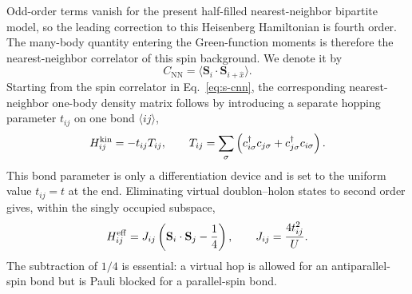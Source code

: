 \documentclass[10pt]{article}
\newcommand{\Cnn}{C_{\mathrm{NN}}}
\begin{document}
Odd-order terms vanish for the present half-filled nearest-neighbor bipartite
model, so the leading correction to this Heisenberg Hamiltonian is fourth
order.  The many-body quantity entering the Green-function moments is
therefore the nearest-neighbor correlator of this spin background.  We denote
it by
\begin{equation}
\Cnn=\langle\mathbf S_i\cdot\mathbf S_{i+\hat x}\rangle.
\label{eq:s-cnn}
\end{equation}
Starting from the spin correlator in Eq.~\ref{eq:s-cnn}, the corresponding
nearest-neighbor one-body density matrix follows by introducing a separate
hopping parameter $t_{ij}$ on one bond $\langle ij\rangle$,
\begin{equation}
 H^{\rm kin}_{ij}=-t_{ij}T_{ij},\qquad
 T_{ij}=\sum_\sigma
 \left(c^\dagger_{i\sigma}c_{j\sigma}
 +c^\dagger_{j\sigma}c_{i\sigma}\right).
\label{eq:s-bond-kinetic-def}
\end{equation}
This bond parameter is only a differentiation device and is set to the uniform
value $t_{ij}=t$ at the end.  Eliminating virtual doublon--holon states to
second order gives, within the singly occupied subspace,
\begin{equation}
 H^{\rm eff}_{ij}=J_{ij}\left(\mathbf S_i\cdot\mathbf S_j-\frac14\right),
 \qquad J_{ij}=\frac{4t_{ij}^2}{U}.
\label{eq:s-bond-effective}
\end{equation}
The subtraction of $1/4$ is essential: a virtual hop is allowed for an
antiparallel-spin bond but is Pauli blocked for a parallel-spin bond.
\end{document}
